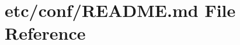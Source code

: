 \hypertarget{etc_2conf_2README_8md}{}\section{etc/conf/\+R\+E\+A\+D\+ME.md File Reference}
\label{etc_2conf_2README_8md}
